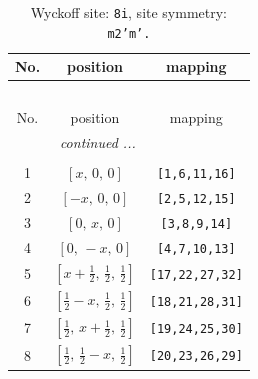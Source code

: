\documentclass[fleqn,8pt]{jsarticle}
\begin{document}
\begin{longtable}{ccc}
\caption{Wyckoff site: {\tt 8i}, site symmetry: {\tt m2'm'.}}
 \\
 \hline \hline
No. & position & mapping \\ \hline \endfirsthead

\multicolumn{2}{l}{\tablename\ \thetable{}} \\
 \hline \hline
No. & position & mapping \\ \hline \endhead

 \hline \hline
\multicolumn{2}{r}{\footnotesize\it continued ...} \\ \endfoot

 \hline \hline
\multicolumn{2}{r}{} \\ \endlastfoot

1 & $\left[ x,\, 0,\, 0 \right]$ & {\tt [1,6,11,16]} \\ \hline
2 & $\left[ - x,\, 0,\, 0 \right]$ & {\tt [2,5,12,15]} \\ \hline
3 & $\left[ 0,\, x,\, 0 \right]$ & {\tt [3,8,9,14]} \\ \hline
4 & $\left[ 0,\, - x,\, 0 \right]$ & {\tt [4,7,10,13]} \\ \hline
5 & $\left[ x + \frac{1}{2},\, \frac{1}{2},\, \frac{1}{2} \right]$ & {\tt [17,22,27,32]} \\ \hline
6 & $\left[ \frac{1}{2} - x,\, \frac{1}{2},\, \frac{1}{2} \right]$ & {\tt [18,21,28,31]} \\ \hline
7 & $\left[ \frac{1}{2},\, x + \frac{1}{2},\, \frac{1}{2} \right]$ & {\tt [19,24,25,30]} \\ \hline
8 & $\left[ \frac{1}{2},\, \frac{1}{2} - x,\, \frac{1}{2} \right]$ & {\tt [20,23,26,29]} \\
\end{longtable}
\renewcommand{\arraystretch}{1.2}
\end{document}
